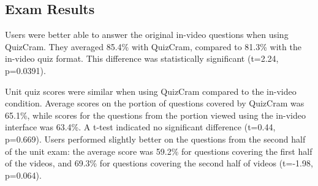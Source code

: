 \documentclass{sigchi}
\begin{document}
\subsection{Exam Results}


Users were better able to answer the original in-video questions when using QuizCram. They averaged 85.4\% with QuizCram, compared to 81.3\% with the in-video quiz format. This difference was statistically significant (t=2.24, p=0.0391). %



Unit quiz scores were similar when using QuizCram compared to the in-video condition. Average scores on the portion of questions covered by QuizCram was 65.1\%, while scores for the questions from the portion viewed using the in-video interface was 63.4\%. A t-test indicated no significant difference (t=0.44, p=0.669). Users performed slightly better on the questions from the second half of the unit exam: the average score was 59.2\% for questions covering the first half of the videos, and 69.3\% for questions covering the second half of videos (t=-1.98, p=0.064).

\end{document}

